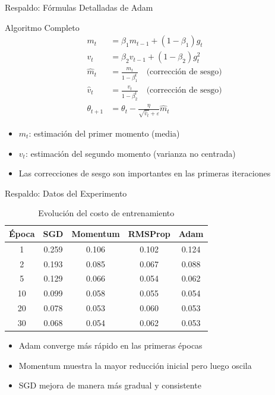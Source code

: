 \documentclass[10pt]{beamer}
\begin{document}
\begin{frame}{Respaldo: Fórmulas Detalladas de Adam}
\begin{block}{Algoritmo Completo}
\begin{align}
m_t &= \beta_1 m_{t-1} + (1-\beta_1) g_t \\
v_t &= \beta_2 v_{t-1} + (1-\beta_2) g_t^2 \\
\hat{m}_t &= \frac{m_t}{1-\beta_1^t} \quad \text{(corrección de sesgo)} \\
\hat{v}_t &= \frac{v_t}{1-\beta_2^t} \quad \text{(corrección de sesgo)} \\
\theta_{t+1} &= \theta_t - \frac{\eta}{\sqrt{\hat{v}_t} + \varepsilon} \hat{m}_t
\end{align}
\end{block}

\begin{itemize}
\item $m_t$: estimación del primer momento (media)
\item $v_t$: estimación del segundo momento (varianza no centrada)
\item Las correcciones de sesgo son importantes en las primeras iteraciones
\end{itemize}
\end{frame}

\begin{frame}{Respaldo: Datos del Experimento}
\begin{table}[ht]
\centering
\footnotesize
\begin{tabular}{c|cccc}
\toprule
\textbf{Época} & \textbf{SGD} & \textbf{Momentum} & \textbf{RMSProp} & \textbf{Adam} \\
\midrule
1 & 0.259 & 0.106 & 0.102 & 0.124 \\
2 & 0.193 & 0.085 & 0.067 & 0.088 \\
5 & 0.129 & 0.066 & 0.054 & 0.062 \\
10 & 0.099 & 0.058 & 0.055 & 0.054 \\
20 & 0.078 & 0.053 & 0.060 & 0.053 \\
30 & 0.068 & 0.054 & 0.062 & 0.053 \\
\bottomrule
\end{tabular}
\caption{Evolución del costo de entrenamiento}
\end{table}

\begin{itemize}
\item Adam converge más rápido en las primeras épocas
\item Momentum muestra la mayor reducción inicial pero luego oscila
\item SGD mejora de manera más gradual y consistente
\end{itemize}
\end{frame}
\end{document}
